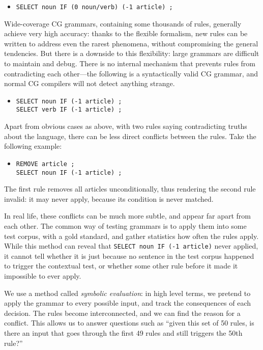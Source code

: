 \begin{itemize}
\item[] \texttt{SELECT noun IF (0 noun/verb) (-1 article) ;}
\end{itemize}

Wide-coverage CG grammars, containing some thousands of rules, 
generally achieve very high accuracy: 
thanks to the flexible formalism, new rules can be written 
to address even the rarest phenomena, without compromising the general tendencies.
But there is a downside to this flexibility: large grammars are difficult to maintain
and debug. There is no internal mechanism that prevents rules from contradicting 
each other---the following is a syntactically valid CG grammar, and normal CG compilers will not detect anything strange.

\begin{itemize}
\item[] \texttt{SELECT noun IF (-1 article) ;} \\ \texttt{SELECT verb IF (-1 article) ;}
\end{itemize}

Apart from obvious cases as above, with two rules saying contradicting truths about the language, there can be less direct conflicts between the rules. Take the following example:

\begin{itemize}
\item[] \texttt{REMOVE article ;} \\ \texttt{SELECT noun IF (-1 article) ;}
\end{itemize}

\noindent The first rule removes all articles unconditionally, thus rendering the second rule invalid: it may never apply, because its condition is never matched.

In real life, these conflicts can be much more subtle, and appear far apart from each other. %
The common way of testing grammars is to apply them into some test corpus, with a gold standard, and gather statistics how often the rules apply. While this method can reveal that \texttt{SELECT noun IF (-1 article)} never applied, it cannot tell whether it is just because no sentence in the test corpus happened to trigger the contextual test, or whether some other rule before it made it impossible to ever apply. 

We use a method called \emph{symbolic evaluation}: in high level terms, we pretend to apply the grammar to every possible input, and track the consequences of each decision. 
The rules become interconnected, and we can find the reason for a conflict. This allows us to answer questions such as ``given this set of 50 rules, is there an input that goes through the first 49 rules and still triggers the 50th rule?''

